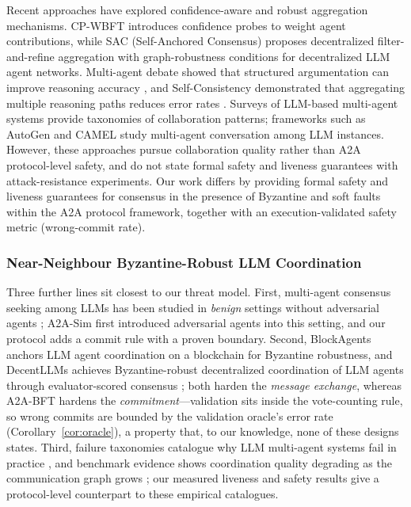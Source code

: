 \documentclass{article}
\begin{document}
Recent approaches have explored confidence-aware and robust aggregation mechanisms. CP-WBFT \citep{zheng2025rethinking} introduces confidence probes to weight agent contributions, while SAC (Self-Anchored Consensus) \citep{lee2026robust} proposes decentralized filter-and-refine aggregation with graph-robustness conditions for decentralized LLM agent networks. Multi-agent debate showed that structured argumentation can improve reasoning accuracy \citep{du2024improving,liang2023encouraging}, and Self-Consistency demonstrated that aggregating multiple reasoning paths reduces error rates \citep{wang2023self}. Surveys of LLM-based multi-agent systems \citep{guo2024survey} provide taxonomies of collaboration patterns; frameworks such as AutoGen \citep{wu2023autogen} and CAMEL \citep{li2023camel} study multi-agent conversation among LLM instances. However, these approaches pursue collaboration quality rather than A2A protocol-level safety, and do not state formal safety and liveness guarantees with attack-resistance experiments. Our work differs by providing formal safety and liveness guarantees for consensus in the presence of Byzantine and soft faults within the A2A protocol framework, together with an execution-validated safety metric (wrong-commit rate).

\subsubsection{Near-Neighbour Byzantine-Robust LLM Coordination}

Three further lines sit closest to our threat model. First, multi-agent consensus seeking among LLMs has been studied in \emph{benign} settings without adversarial agents \citep{chen2023macs}; A2A-Sim \citep{a2a_sim_2026} first introduced adversarial agents into this setting, and our protocol adds a commit rule with a proven boundary. Second, BlockAgents \citep{chen2024blockagents} anchors LLM agent coordination on a blockchain for Byzantine robustness, and DecentLLMs achieves Byzantine-robust decentralized coordination of LLM agents through evaluator-scored consensus \citep{jo2025byzantine}; both harden the \emph{message exchange}, whereas A2A-BFT hardens the \emph{commitment}---validation sits inside the vote-counting rule, so wrong commits are bounded by the validation oracle's error rate (Corollary~\ref{cor:oracle}), a property that, to our knowledge, none of these designs states. Third, failure taxonomies catalogue why LLM multi-agent systems fail in practice \citep{cemri2025why}, and benchmark evidence shows coordination quality degrading as the communication graph grows \citep{grotschla2025agentsnet}; our measured liveness and safety results give a protocol-level counterpart to these empirical catalogues.
\end{document}
